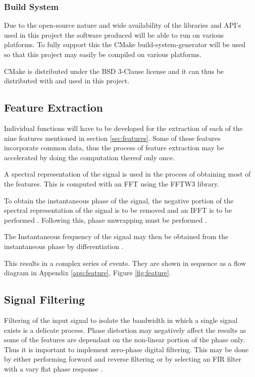 \documentclass[10pt,twocolumn]{witseiepaper}
\begin{document}
		\subsubsection{Build System}
			Due to the open-source nature and wide availability of the libraries and API's used in this project the software produced will be able to run on various platforms. To fully support this the CMake build-system-generator will be used so that this project may easily be compiled on various platforms.

			CMake is distributed under the BSD 3-Clause license \cite{cmake_license} and it can thus be distributed with and used in this project.

	\subsection{Feature Extraction}
		\label{sec:feat_fun}
		Individual functions will have to be developed for the extraction of each of the nine features mentioned in section \ref{sec:features}. Some of these features incorporate common data, thus the process of feature extraction may be accelerated by doing the computation thereof only once.

		A spectral representation of the signal is used in the process of obtaining most of the features. This is computed with an FFT using the FFTW3 library. 
		
		To obtain the instantaneous phase of the signal, the negative portion of the spectral representation of the signal is to be removed and an IFFT is to be performed \cite{picinbono1997instantaneous}. Following this, phase unwrapping must be performed \cite{park2009introduction, picinbono1997instantaneous}.

		The Instantaneous frequency of the signal may then be obtained from the instantaneous phase by differentiation \cite{park2009introduction}.

		This results in a complex series of events. They are shown in sequence as a flow diagram in Appendix \ref{app:feature}, Figure \ref{fig:feature}.

	\subsection{Signal Filtering}
		Filtering of the input signal to isolate the bandwidth in which a single signal exists is a delicate process. 
		Phase distortion may negatively affect the results as some of the features are dependant on the non-linear portion of the phase only. 
		Thus it is important to implement zero-phase digital filtering.
		This may be done by either performing forward and reverse filtering or by selecting an FIR filter with a vary flat phase response \cite{sundararajan2003digital}.
\end{document}
